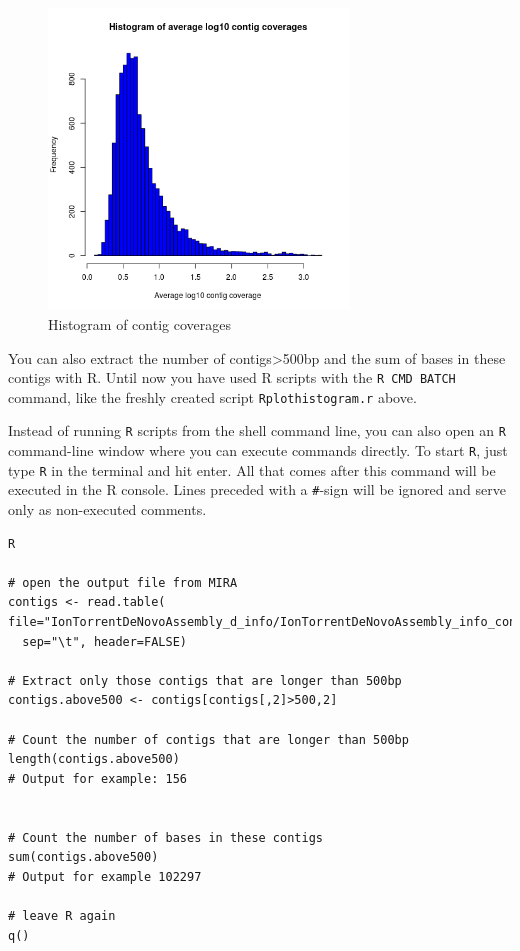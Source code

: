 \documentclass[11pt]{article}
\begin{document}
\begin{figure}[htb]
\centering
\includegraphics[width=8cm]{ContigCoverages.png}
\caption{\label{fig:histcontcov}Histogram of contig coverages}
\end{figure}





You can also extract the number of contigs>500bp and the sum of bases
in these contigs with R. Until now you have used R scripts with the \texttt{R
CMD BATCH} command, like the freshly created script \texttt{Rplothistogram.r}
above.

Instead of running \texttt{R} scripts from the shell command line, you can
also open an \texttt{R} command-line window where you can execute commands
directly. To start \texttt{R}, just type \texttt{R} in the terminal and hit
enter. All that comes after this command will be executed in the R
console. Lines preceded with a \texttt{\#}-sign will be ignored and serve only as
non-executed comments.

\begin{verbatim}
R

# open the output file from MIRA
contigs <- read.table( 
file="IonTorrentDeNovoAssembly_d_info/IonTorrentDeNovoAssembly_info_contigstats.txt", 
  sep="\t", header=FALSE)

# Extract only those contigs that are longer than 500bp
contigs.above500 <- contigs[contigs[,2]>500,2]

# Count the number of contigs that are longer than 500bp
length(contigs.above500)
# Output for example: 156


# Count the number of bases in these contigs
sum(contigs.above500)
# Output for example 102297

# leave R again
q()
\end{verbatim}
\end{document}
